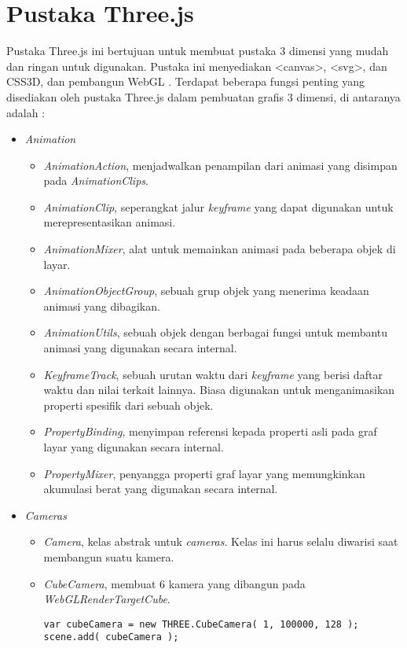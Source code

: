 \section{Pustaka Three.js}
\label{sec:latex}
Pustaka Three.js ini bertujuan untuk membuat pustaka 3 dimensi yang mudah dan ringan untuk digunakan. Pustaka ini menyediakan <canvas>, <svg>, dan CSS3D, dan pembangun WebGL \cite{githubthreejs}.
Terdapat beberapa fungsi penting yang disediakan oleh pustaka Three.js dalam pembuatan grafis 3 dimensi, di antaranya adalah \cite{threejs}:
\begin{itemize}

\item \textit{Animation}

	\begin{itemize}
	\item {\it AnimationAction}, menjadwalkan penampilan dari animasi yang disimpan pada {\it AnimationClips}.
	\item {\it AnimationClip}, seperangkat jalur {\it keyframe} yang dapat digunakan untuk merepresentasikan animasi.
	\item {\it AnimationMixer}, alat untuk memainkan animasi pada beberapa objek di layar.
	\item {\it AnimationObjectGroup}, sebuah grup objek yang menerima keadaan animasi yang dibagikan.
	\item {\it AnimationUtils}, sebuah objek dengan berbagai fungsi untuk membantu animasi yang digunakan secara internal.
	\item {\it KeyframeTrack}, sebuah urutan waktu dari {\it keyframe} yang berisi daftar waktu dan nilai terkait lainnya. Biasa digunakan untuk menganimasikan properti spesifik dari sebuah objek.
	\item {\it PropertyBinding}, menyimpan referensi kepada properti asli pada graf layar yang digunakan secara internal.
	\item {\it PropertyMixer}, penyangga properti graf layar yang memungkinkan akumulasi berat yang digunakan secara internal.
	\end{itemize}

\item \textit{Cameras}

	\begin{itemize}
	\item {\it Camera}, kelas abstrak untuk {\it cameras}. Kelas ini harus selalu diwarisi saat membangun suatu kamera.
	
	\item {\it CubeCamera}, membuat 6 kamera yang dibangun pada {\it WebGLRenderTargetCube}.
	\begin{lstlisting}
var cubeCamera = new THREE.CubeCamera( 1, 100000, 128 );
scene.add( cubeCamera );
\end{lstlisting}
	

\end{itemize}
\end{itemize}
